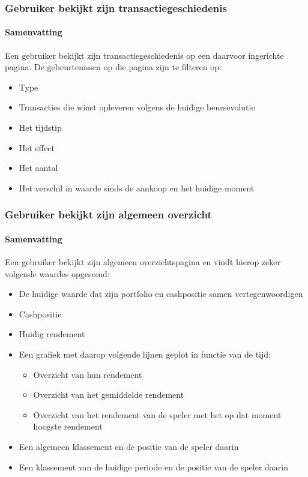 \subsubsection{Gebruiker bekijkt zijn transactiegeschiedenis}
\paragraph{Samenvatting} Een gebruiker bekijkt zijn transactiegeschiedenis op een daarvoor ingerichte pagina. De gebeurtenissen op die pagina zijn te filteren op:

\begin{itemize}
	\item Type
	\item Transacties die winst opleveren volgens de huidige beursevolutie
	\item Het tijdstip
	\item Het effect
	\item Het aantal
	\item Het verschil in waarde sinds de aankoop en het huidige moment
\end{itemize}

\subsubsection{Gebruiker bekijkt zijn algemeen overzicht}
\paragraph{Samenvatting} Een gebruiker bekijkt zijn algemeen overzichtspagina en vindt hierop zeker volgende waardes opgesomd:
\begin{itemize}
	\item De huidige waarde dat zijn portfolio en cashpositie samen vertegenwoordigen
	\item Cashpositie
	\item Huidig rendement
	\item Een grafiek met daarop volgende lijnen geplot in functie van de tijd:
  \begin{itemize}
  	\item  Overzicht van hun rendement
    \item Overzicht van het gemiddelde rendement
    \item Overzicht van het rendement van de speler met het op dat moment hoogste rendement
  \end{itemize}
  \item Een algemeen klassement en de positie van de speler daarin
  \item Een klassement van de huidige periode en de positie van de speler daarin
\end{itemize}

